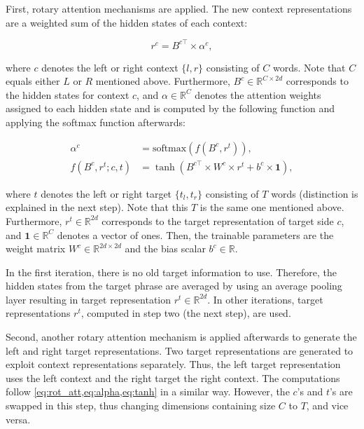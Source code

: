 \documentclass[american, oneside]{ecsgdp}
\begin{document}
First, rotary attention mechanisms are applied. The new context representations are a weighted sum of the hidden states of each context: 

\begin{equation}
    r^c = B^{c\top} \times \alpha^c, \label{eq:rot_att}
\end{equation}

\noindent where $c$ denotes the left or right context $\{l, r\}$ consisting of $C$ words. Note that $C$ equals either $L$ or $R$ mentioned above. Furthermore, $B^c \in \mathbb{R}^{C \times 2d}$ corresponds to the hidden states for context $c$, and $\alpha \in \mathbb{R}^{C}$ denotes the attention weights assigned to each hidden state and is computed by the following function and applying the softmax function afterwards:

\begin{align}
    \alpha^c                         & = \text{softmax}\left( f \left( B^c, r^t\right) \right), \label{eq:alpha}\\
    f \left( B^c, r^t; c, t \right) & = \tanh{\left( B^{c\top} \times W^c \times r^t + b^c \times \mathbf{1} \right)}, \label{eq:tanh}
\end{align}

\noindent where $t$ denotes the left or right target $\{t_l, t_r\}$ consisting of $T$ words (distinction is explained in the next step). Note that this $T$ is the same one mentioned above. Furthermore, $r^t \in \mathbb{R}^{2d}$ corresponds to the target representation of target side $c$, and $\mathbf{1} \in \mathbb{R}^{C}$ denotes a vector of ones. Then, the trainable parameters are the weight matrix $W^c \in \mathbb{R}^{2d \times 2d}$ and the bias scalar $b^c \in \mathbb{R}$.

In the first iteration, there is no old target information to use. Therefore, the hidden states from the target phrase are averaged by using an average pooling layer resulting in target representation $r^t \in \mathbb{R}^{2d}$. In other iterations, target representations $r^t$, computed in step two (the next step), are used.

Second, another rotary attention mechanism is applied afterwards to generate the left and right target representations. Two target representations are generated to exploit context representations separately. Thus, the left target representation uses the left context and the right target the right context. The computations follow \cref{eq:rot_att,eq:alpha,eq:tanh} in a similar way. However, the $c$'s and $t$'s are swapped in this step, thus changing dimensions containing size $C$ to $T$, and vice versa.
\end{document}
